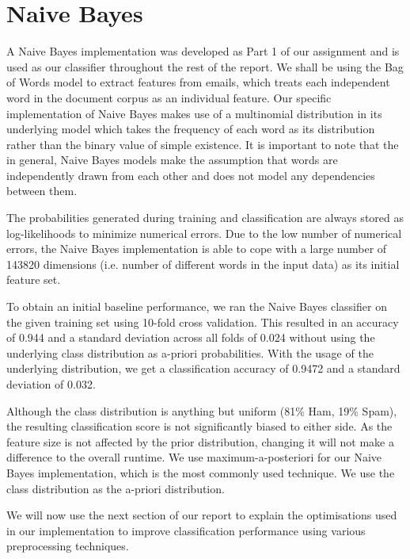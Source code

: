 \section{Naive Bayes}
A Naive Bayes implementation was developed as Part 1 of our assignment and is used as our classifier throughout the rest of the report.
We shall be using the Bag of Words model to extract features from emails, which treats each independent word in the document corpus as an individual feature.
Our specific implementation of Naive Bayes makes use of a multinomial distribution in its underlying model which takes the frequency of each word as its distribution rather than the binary value of simple existence.
It is important to note that the in general, Naive Bayes models make the assumption that words are independently drawn from each other and does not model any dependencies between them.

The probabilities generated during training and classification are always stored as log-likelihoods to minimize numerical errors.
Due to the low number of numerical errors, the Naive Bayes implementation is able to cope with a large number of 143820 dimensions (i.e. number of different words in the input data) as its initial feature set.

To obtain an initial baseline performance, we ran the Naive Bayes classifier on the given training set using 10-fold cross validation.
This resulted in an accuracy of 0.944 and a standard deviation across all folds of 0.024 without using the underlying class distribution as a-priori probabilities.
With the usage of the underlying distribution, we get a classification accuracy of 0.9472 and a standard deviation of 0.032.

Although the class distribution is anything but uniform (81\% Ham, 19\% Spam), the resulting classification score is not significantly biased to either side.
As the feature size is not affected by the prior distribution, changing it will not make a difference to the overall runtime. We use maximum-a-posteriori for our Naive Bayes implementation, which is the most commonly used technique. We use the class distribution as the a-priori distribution.

We will now use the next section of our report to explain the optimisations used in our implementation to improve classification performance using various preprocessing techniques.

